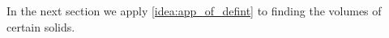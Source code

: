 %

In the next section we apply \autoref{idea:app_of_defint} to finding the volumes of certain solids.

